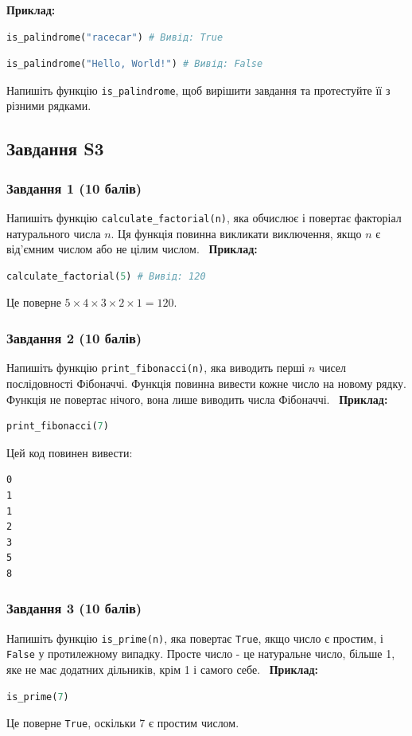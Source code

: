 \documentclass[12pt]{article}
\begin{document}
\textbf{Приклад:}
\begin{lstlisting}[language=Python]
is_palindrome("racecar") # Вивід: True
\end{lstlisting}

\begin{lstlisting}[language=Python]
is_palindrome("Hello, World!") # Вивід: False
\end{lstlisting}

Напишіть функцію \texttt{is\_palindrome}, щоб вирішити завдання та протестуйте її з різними рядками.

\newpage

\newpage

\subsection{Завдання S3}

\subsubsection{Завдання 1 (10 балів)}
Напишіть функцію \texttt{calculate\_factorial(n)}, яка обчислює і повертає факторіал натурального числа $n$. Ця функція повинна викликати виключення, якщо $n$ є від'ємним числом або не цілим числом. \
\textbf{Приклад:}
\begin{lstlisting}[language=Python]
calculate_factorial(5) # Вивід: 120
\end{lstlisting}
Це поверне $5 \times 4 \times 3 \times 2 \times 1 = 120$.

\subsubsection{Завдання 2 (10 балів)}
Напишіть функцію \texttt{print\_fibonacci(n)}, яка виводить перші $n$ чисел послідовності Фібоначчі. Функція повинна вивести кожне число на новому рядку. Функція не повертає нічого, вона лише виводить числа Фібоначчі. \
\textbf{Приклад:}
\begin{lstlisting}[language=Python]
print_fibonacci(7)
\end{lstlisting}
Цей код повинен вивести:
\begin{verbatim}
0
1
1
2
3
5
8
\end{verbatim}

\subsubsection{Завдання 3 (10 балів)}
Напишіть функцію \texttt{is\_prime(n)}, яка повертає \texttt{True}, якщо число є простим, і \texttt{False} у протилежному випадку. Просте число - це натуральне число, більше 1, яке не має додатних дільників, крім 1 і самого себе. \
\textbf{Приклад:}
\begin{lstlisting}[language=Python]
is_prime(7)
\end{lstlisting}
Це поверне \texttt{True}, оскільки 7 є простим числом.
\end{document}
